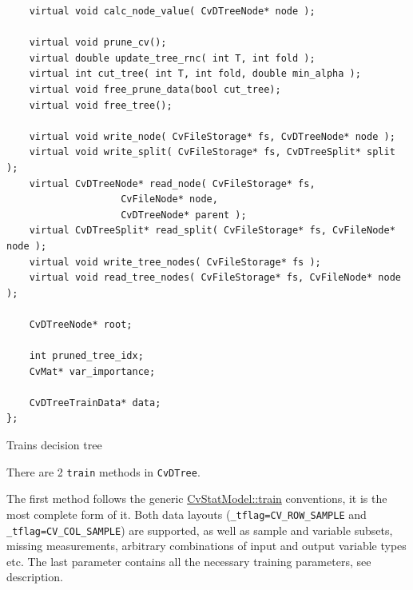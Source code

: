 \begin{lstlisting}
    virtual void calc_node_value( CvDTreeNode* node );

    virtual void prune_cv();
    virtual double update_tree_rnc( int T, int fold );
    virtual int cut_tree( int T, int fold, double min_alpha );
    virtual void free_prune_data(bool cut_tree);
    virtual void free_tree();

    virtual void write_node( CvFileStorage* fs, CvDTreeNode* node );
    virtual void write_split( CvFileStorage* fs, CvDTreeSplit* split );
    virtual CvDTreeNode* read_node( CvFileStorage* fs, 
				    CvFileNode* node, 
				    CvDTreeNode* parent );
    virtual CvDTreeSplit* read_split( CvFileStorage* fs, CvFileNode* node );
    virtual void write_tree_nodes( CvFileStorage* fs );
    virtual void read_tree_nodes( CvFileStorage* fs, CvFileNode* node );

    CvDTreeNode* root;

    int pruned_tree_idx;
    CvMat* var_importance;

    CvDTreeTrainData* data;
};
\end{lstlisting}



Trains decision tree


There are 2 \texttt{train} methods in \texttt{CvDTree}.

The first method follows the generic \href{#CvStatModel.3A.3Atrain}{CvStatModel::train} conventions,  it is the most complete form of it. Both data layouts (\texttt{\_tflag=CV\_ROW\_SAMPLE} and \texttt{\_tflag=CV\_COL\_SAMPLE}) are supported, as well as sample and variable subsets, missing measurements, arbitrary combinations of input and output variable types etc. The last parameter contains all the necessary training parameters, see  description.

